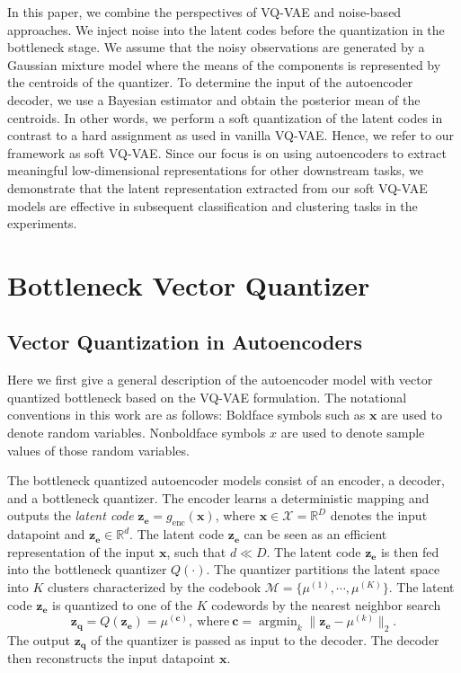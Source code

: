 \documentclass[letterpaper]{article} %
\DeclareMathOperator*{\argmin}{arg\min}
\begin{document}
In this paper, we combine the perspectives of VQ-VAE and noise-based approaches. We inject noise into the latent codes before the quantization in the bottleneck stage. We assume that the noisy observations are generated by a Gaussian mixture model where the means of the components is represented by the centroids of the quantizer. To determine the input of the autoencoder decoder, we use a Bayesian estimator and obtain the posterior mean of the centroids. In other words, we perform a soft quantization of the latent codes in contrast to a hard assignment as used in vanilla VQ-VAE. Hence, we refer to our framework as soft VQ-VAE. Since our focus is on using autoencoders to extract meaningful low-dimensional representations for other downstream tasks, we demonstrate that the latent representation extracted from our soft VQ-VAE models are effective in subsequent classification and clustering tasks in the experiments.
\section{Bottleneck Vector Quantizer}
\label{quantization}
\subsection{Vector Quantization in Autoencoders}
\label{subsec:vq-vae}
 Here we first give a general description of the autoencoder model with vector quantized bottleneck based on the VQ-VAE formulation. The notational conventions in this work are as follows: Boldface symbols such as $\mathbf{x}$ are used to denote random variables. Nonboldface symbols $x$ are used to denote sample values of those random variables.
 
 The bottleneck quantized autoencoder models consist of an encoder, a decoder, and a bottleneck quantizer. The encoder learns a deterministic mapping and outputs the \emph{latent code} $\mathbf{z_e} = g_{\text{enc}}(\mathbf{x})$, where $\mathbf{x} \in \mathcal{X} = \mathbb{R}^{D}$ denotes the input datapoint and $\mathbf{z_e} \in \mathbb{R}^{d}$. The latent code $\mathbf{z_e}$ can be seen as an efficient representation of the input $\mathbf{x}$, such that $d \ll D$. The latent code $\mathbf{z_e}$ is then fed into the bottleneck quantizer $Q(\cdot)$. The quantizer partitions the latent space into $K$ clusters characterized by the codebook $\mathcal{M}  = \{\mu^{(1)}, \cdots, \mu^{(K)}\}$. The latent code $\mathbf{z_e}$ is quantized to one of the $K$ codewords by the nearest neighbor search
 \begin{equation}
 \label{eq:assgn1}
 \mathbf{z_q} = Q(\mathbf{z_e}) = \mu^{(\mathbf{c})}, \ \text{where} \ \mathbf{c} = \argmin_k\|\mathbf{z_e}-\mu^{(k)}\|_2.
 \end{equation} 
 The output $\mathbf{z_q}$ of the quantizer is passed as input to the decoder. The decoder then reconstructs the input datapoint $\mathbf{x}$. 
\end{document}
